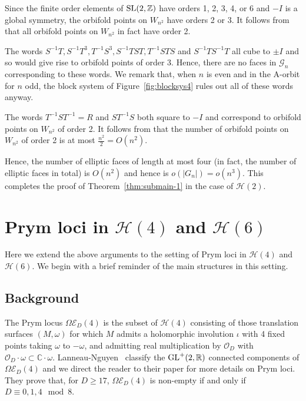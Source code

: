 \documentclass[a4paper,11pt]{amsart}
\numberwithin{equation}{section}
\numberwithin{figure}{section}
\numberwithin{table}{section}
\newcommand{\calH}{\mathcal{H}}
\newcommand{\C}{\mathbb{C}}
\newcommand{\Z}{\mathbb{Z}}
\newcommand{\R}{\mathbb{R}}
\DeclareMathOperator{\SL}{{\rm{SL}}}
\DeclareMathOperator{\GL}{{\rm{GL}}}
\begin{document}
Since the finite order elements of $\SL(2,\Z)$ have orders 1, 2, 3, 4, or 6 and $-I$ is a global symmetry, the orbifold points on $W_{n^{2}}$ have orders 2 or 3. It follows from {\cite[Theorem 1.1]{Muk}} that all orbifold points on $W_{n^{2}}$ in fact have order 2.

The words $S^{-1}T, S^{-1}T^{3}, T^{-1}S^3, S^{-1}TST, T^{-1}STS$ and $S^{-1}TS^{-1}T$ all cube to $\pm I$ and so would give rise to orbifold points of order 3. Hence, there are no faces in $\mathcal{G}_{n}$ corresponding to these words. We remark that, when $n$ is even and in the A-orbit for $n$ odd, the block system of Figure~\ref{fig:blocksys4} rules out all of these words anyway.

The words $T^{-1}ST^{-1} = R$ and $ST^{-1}S$ both square to $-I$ and correspond to orbifold points on $W_{n^{2}}$ of order 2. It follows from {\cite[Proposition 4.7]{Muk}} that the number of orbifold points on $W_{n^{2}}$ of order 2 is at most $\frac{n^2}{2} = O(n^{2})$.

Hence, the number of elliptic faces of length at most four (in fact, the number of elliptic faces in total) is $O(n^2)$ and hence is $o(|G_{n}|) = o(n^3)$. This completes the proof of Theorem~\ref{thm:submain-1} in the case of $\calH(2)$.


\section{Prym loci in $\calH(4)$ and $\calH(6)$}\label{sec:prym}

Here we extend the above arguments to the setting of Prym loci in $\calH(4)$ and $\calH(6)$. We begin with a brief reminder of the main structures in this setting.


\subsection{Background}

The Prym locus $\Omega\mathcal{E}_{D}(4)$ is the subset of $\calH(4)$ consisting of those translation surfaces $(M,\omega)$ for which $M$ admits a holomorphic involution $\iota$ with 4 fixed points taking $\omega$ to $-\omega$, and admitting real multiplication by $\mathcal{O}_{D}$ with $\mathcal{O}_{D}\cdot\omega\subset\C\cdot\omega$. Lanneau-Nguyen~\cite{LN14} classify the $\GL^{+}(2,\R)$ connected components of $\Omega\mathcal{E}_{D}(4)$ and we direct the reader to their paper for more details on Prym loci. They prove that, for $D\geq 17$,  $\Omega\mathcal{E}_{D}(4)$ is non-empty if and only if $D\equiv 0,1,4\!\!\mod\! 8$.
\end{document}
